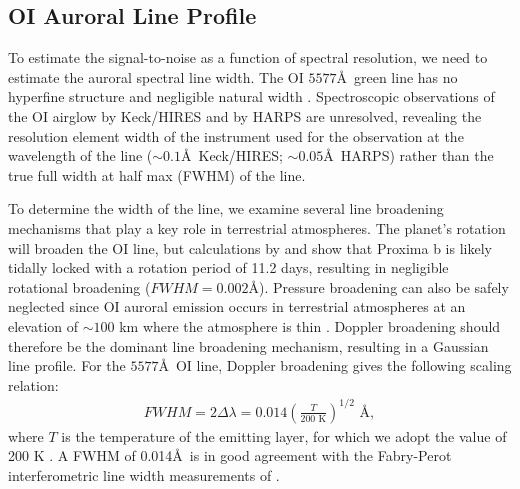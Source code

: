 \documentclass{emulateapj}
\newcommand{\yyy}[1]{{\color{black} #1}} %
\begin{document}
\subsection{OI Auroral Line Profile}
\label{sec:line_profile}

To estimate the signal-to-noise as a function of spectral resolution, we need to estimate the auroral spectral line width.  The OI $5577$\AA\ green line has no hyperfine structure and negligible natural width \citep{Hunten1967}.
Spectroscopic observations of the OI airglow by Keck/HIRES \citep{Slanger2001} and by HARPS \citep[][see \S\ref{sec:search}]{Anglada-Escude2016} are unresolved, revealing the resolution element width of the instrument used for the observation at the wavelength of the line (${\sim}0.1$\AA\ Keck/HIRES; ${\sim}0.05$\AA\ HARPS) rather than the true full width at half max (FWHM) of the line.

To determine the width of the line, we examine several line broadening mechanisms that play a key role in terrestrial atmospheres.   The planet's rotation will broaden the OI line, but calculations by \citet{Barnes2016} and \citet{Ribas2016} show that Proxima b is likely tidally locked with a rotation period of 11.2 days, resulting in negligible rotational broadening ($FWHM = 0.002$\AA).  Pressure broadening can also be safely neglected since OI auroral emission occurs in terrestrial atmospheres at an elevation of ${\sim}100$ km where the atmosphere is thin \citep{Slanger2001}. Doppler broadening should therefore be the dominant line broadening mechanism, resulting in a Gaussian line profile. For the $5577$\AA\ OI line, Doppler broadening gives the following scaling relation:
\begin{align}
    FWHM = 2\Delta \lambda = 0.014 \left ( \frac{T}{200 \text{ K}} \right )^{1/2} \text{ \AA}, \label{eq:doppler}
\end{align}
\noindent where $T$ is the temperature of the emitting layer, for which we adopt the value of 200 K \citep[c.f.][]{Slanger2001}. 
A FWHM of 0.014\AA\ is in good agreement with the Fabry-Perot interferometric line width measurements of \citet{Wark1960}.
\end{document}
